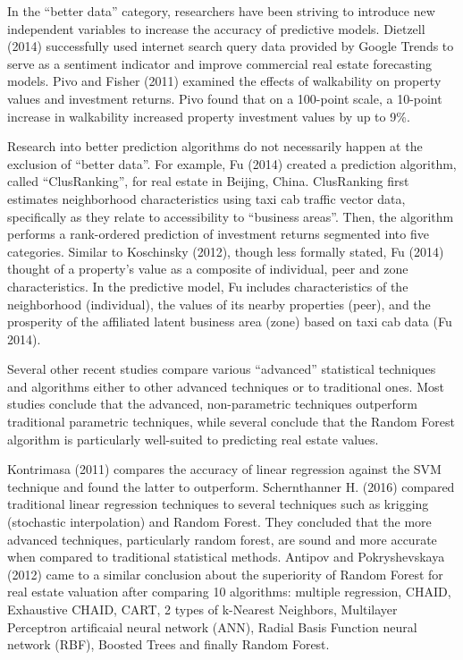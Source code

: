 \documentclass[12pt,]{article}
\begin{document}
In the ``better data'' category, researchers have been striving to
introduce new independent variables to increase the accuracy of
predictive models. Dietzell (2014) successfully used internet search
query data provided by Google Trends to serve as a sentiment indicator
and improve commercial real estate forecasting models. Pivo and Fisher
(2011) examined the effects of walkability on property values and
investment returns. Pivo found that on a 100-point scale, a 10-point
increase in walkability increased property investment values by up to
9\%.

Research into better prediction algorithms do not necessarily happen at
the exclusion of ``better data''. For example, Fu (2014) created a
prediction algorithm, called ``ClusRanking'', for real estate in
Beijing, China. ClusRanking first estimates neighborhood characteristics
using taxi cab traffic vector data, specifically as they relate to
accessibility to ``business areas''. Then, the algorithm performs a
rank-ordered prediction of investment returns segmented into five
categories. Similar to Koschinsky (2012), though less formally stated,
Fu (2014) thought of a property's value as a composite of individual,
peer and zone characteristics. In the predictive model, Fu includes
characteristics of the neighborhood (individual), the values of its
nearby properties (peer), and the prosperity of the affiliated latent
business area (zone) based on taxi cab data (Fu 2014).

Several other recent studies compare various ``advanced'' statistical
techniques and algorithms either to other advanced techniques or to
traditional ones. Most studies conclude that the advanced,
non-parametric techniques outperform traditional parametric techniques,
while several conclude that the Random Forest algorithm is particularly
well-suited to predicting real estate values.

Kontrimasa (2011) compares the accuracy of linear regression against the
SVM technique and found the latter to outperform. Schernthanner H.
(2016) compared traditional linear regression techniques to several
techniques such as krigging (stochastic interpolation) and Random
Forest. They concluded that the more advanced techniques, particularly
random forest, are sound and more accurate when compared to traditional
statistical methods. Antipov and Pokryshevskaya (2012) came to a similar
conclusion about the superiority of Random Forest for real estate
valuation after comparing 10 algorithms: multiple regression, CHAID,
Exhaustive CHAID, CART, 2 types of k-Nearest Neighbors, Multilayer
Perceptron artificaial neural network (ANN), Radial Basis Function
neural network (RBF), Boosted Trees and finally Random Forest.
\end{document}
